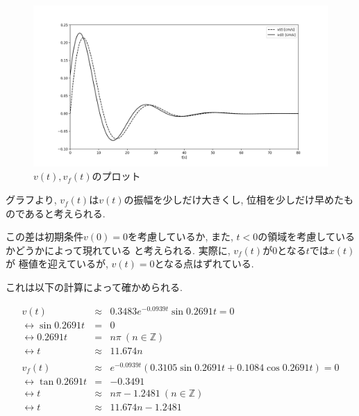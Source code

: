 \documentclass[titlepage]{jsarticle}
\begin{document}
            \begin{figure}[h]
                \centering
                \includegraphics[width=15cm]{img/versus.png}
                \caption{$v(t), v_f(t)$のプロット}
                \label{fig:versus}
            \end{figure}

            グラフより, $v_f(t)$は$v(t)$の振幅を少しだけ大きくし,
            位相を少しだけ早めたものであると考えられる.

            この差は初期条件$v(0) = 0$を考慮しているか,
            また, $t < 0$の領域を考慮しているかどうかによって現れている
            と考えられる.
            実際に, $v_f(t)が0$となる$t$では$x(t)$が
            極値を迎えているが,
            $v(t) = 0$となる点はずれている.

            これは以下の計算によって確かめられる.

            \begin{eqnarray*}
                v(t) &\approx& 0.3483 e^{-0.0939t}\sin{0.2691t} = 0 \\
                \leftrightarrow \sin{0.2691t} &=& 0 \\
                \leftrightarrow 0.2691t &=& n \pi \ (n \in \mathbb{Z}) \\
                \leftrightarrow t &\approx& 11.674n \\ \\
                v_f(t) &\approx& e^{-0.0939 t} (0.3105\sin{0.2691t} + 0.1084 \cos{0.2691t}) = 0 \\
                \leftrightarrow \tan{0.2691t} &=& -0.3491 \\
                \leftrightarrow t &\approx& n \pi - 1.2481 \ (n \in \mathbb{Z}) \\
                \leftrightarrow t &\approx& 11.674n - 1.2481
            \end{eqnarray*}
\end{document}
